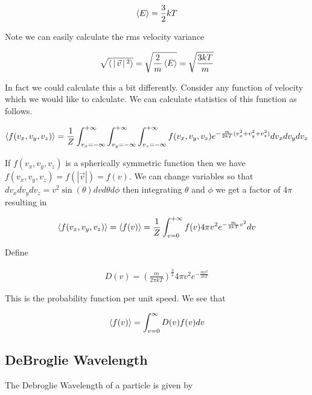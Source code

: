 \documentclass[12pt]{article}
\begin{document}
\begin{align}
\Braket{E} = \frac{3}{2} kT
\end{align}

Note we can easily calculate the rms velocity variance

\begin{align}
\sqrt{\Braket{|\vec{v}|^2}} = \sqrt{\frac{2}{m}\Braket{E}} = \sqrt{\frac{3kT}{m}}
\end{align}

In fact we could calculate this a bit differently. Consider any function of velocity which we would like to calculate. We can calculate statistics of this function as follows.

\begin{align}
\Braket{f(v_x,v_y,v_z)} = \frac{1}{Z} \int_{v_x=-\infty}^{+\infty}\int_{v_y=-\infty}^{+\infty}\int_{v_z=-\infty}^{+\infty} f(v_x,v_y,v_z) e^{-\frac{m}{2kT} (v_x^2+v_y^2+v_z^2)} dv_xdv_ydv_z\\
\end{align}

If $f(v_x,v_y,v_z)$ is a spherically symmetric function then we have $f(v_x,v_y,v_z) = f(|\vec{v}|) = f(v)$. We can change variables so that $dv_xdv_ydv_z = v^2 \sin(\theta) dv d\theta d\phi$ then integrating $\theta$ and $\phi$ we get a factor of $4\pi$ resulting in

\begin{align}
\Braket{f(v_x,v_y,v_z)} = \Braket{f(v)} = \frac{1}{Z} \int_{v=0}^{+\infty} f(v) 4\pi v^2 e^{-\frac{m}{2kT} v^2} dv\\
\end{align}

Define

\begin{align}
D(v) = \left(\frac{m}{2\pi kT}\right)^{\frac{3}{2}} 4\pi v^2 e^{-\frac{m v^2}{2 kT}}
\end{align}

This is the probability function per unit speed. We see that

\begin{align}
\Braket{f(v)} = \int_{v=0}^{\infty} D(v) f(v) dv
\end{align}

\subsection{DeBroglie Wavelength}

The Debroglie Wavelength of a particle is given by
\end{document}
